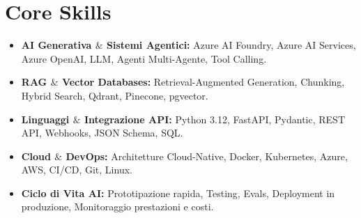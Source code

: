 \documentclass[a4paper,10pt]{article}
\begin{document}
\section{Core Skills}
\begin{itemize}
  \item \textbf{AI Generativa $\&$ Sistemi Agentici:} Azure AI Foundry, Azure AI Services, Azure OpenAI, LLM, Agenti Multi-Agente, Tool Calling.
  \item \textbf{RAG $\&$ Vector Databases:} Retrieval-Augmented Generation, Chunking, Hybrid Search, Qdrant, Pinecone, pgvector.
  \item \textbf{Linguaggi $\&$ Integrazione API:} Python 3.12, FastAPI, Pydantic, REST API, Webhooks, JSON Schema, SQL.
  \item \textbf{Cloud $\&$ DevOps:} Architetture Cloud-Native, Docker, Kubernetes, Azure, AWS, CI/CD, Git, Linux.
  \item \textbf{Ciclo di Vita AI:} Prototipazione rapida, Testing, Evals, Deployment in produzione, Monitoraggio prestazioni e costi.
\end{itemize}
\end{document}
